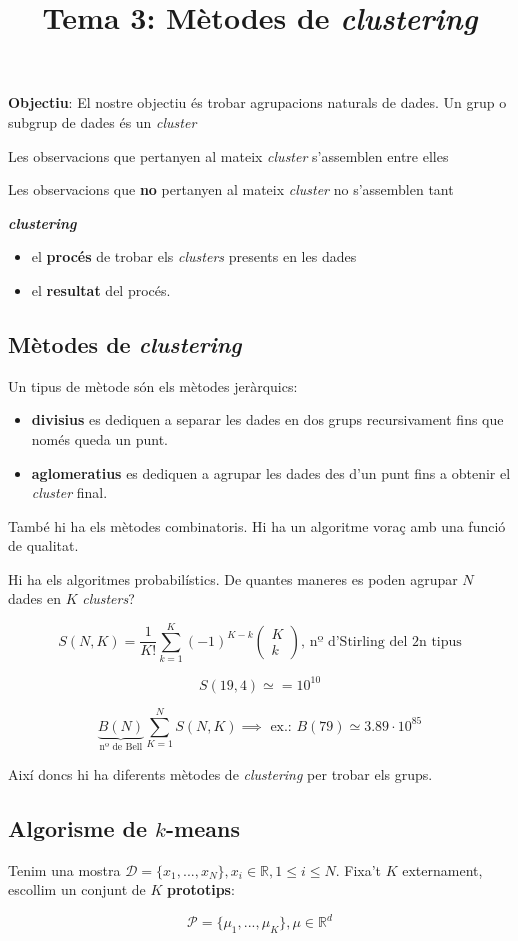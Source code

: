 \documentclass[a4paper]{article}
\title{Tema 3: Mètodes de \emph{clustering}}
\begin{document}
	
\maketitle

\textbf{Objectiu}: El nostre objectiu és trobar agrupacions naturals de dades. Un grup o subgrup de dades és un \emph{cluster}

Les observacions que pertanyen al mateix \emph{cluster} s'assemblen entre elles

Les observacions que \textbf{no} pertanyen al mateix \emph{cluster} no s'assemblen tant

\textbf{\emph{clustering}}

\begin{itemize}
	\item el \textbf{procés} de trobar els \emph{clusters} presents en les dades
	\item el \textbf{resultat} del procés.
\end{itemize}


\subsection{Mètodes de \emph{clustering}}

Un tipus de mètode són els mètodes jeràrquics:
\begin{itemize}
	\item \textbf{divisius} es dediquen a separar les dades en dos grups recursivament fins que només queda un punt.
	\item \textbf{aglomeratius} es dediquen a agrupar les dades des d'un punt fins a obtenir el \emph{cluster} final.
\end{itemize}


També hi ha els mètodes combinatoris. Hi ha un algoritme voraç amb una funció de qualitat.

Hi ha els algoritmes probabilístics. De quantes maneres es poden agrupar $N$ dades en $K$ \emph{clusters}?

$$ S(N, K) = \frac{1}{K!} \sum_{k=1}^K (-1)^{K-k} \begin{pmatrix}
K \\ k
\end{pmatrix} \text{, nº d'Stirling del 2n tipus} $$

$$ S(19,4) \simeq = 10^10 $$

$$ \underbrace{B(N)}_{\text{nº de Bell}} \sum_{K=1}^{N} S(N,K) \implies \text{ ex.: } B(79) \simeq 3.89·10^85 $$

Així doncs hi ha diferents mètodes de \emph{clustering} per trobar els grups.

\subsection{Algorisme de $k$-means}

Tenim una mostra $\mathcal{D} = \{ x_1,..., x_N \} , x_i \in \mathbb{R}, 1 \le i \le N$. Fixa't $K$ externament, escollim un conjunt de $K$ \textbf{prototips}:

$$ \mathcal{P} = \{ \mu_1, ..., \mu_K \}, \mu \in \mathbb{R}^d $$
\end{document}
